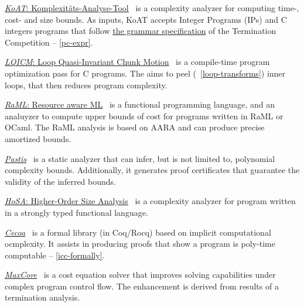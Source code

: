\begin{description}
\item  \href{https://koat.verify.rwth-aachen.de/cfr_mprf}{\emph{KoAT}:
       \underline{Ko}mplexitäts-\underline{A}nalyse-\underline{T}ool}~\cite{brockschmidt2016}
       is a complexity analyzer for computing time-, cost- and size bounds.
       As inputs, KoAT accepts Integer Programs (IPs) and C integers programs that follow
       \href{https://termination-portal.org/wiki/C_Integer_Programs}{the grammar specification} of the Termination Competition -- \autoref{pc-expr}.

\item  \href{https://github.com/statycc/LQICM_On_C_Toy_Parser}{\emph{LQICM}: Loop Quasi-Invariant Chunk Motion}~\cite{moyen20172}
       is a compile-time program optimization pass for C programs.
       The aims to peel (\cf~\autoref{loop-transforms}) inner loops, that then reduces program complexity.

\item   \href{https://www.raml.co/about/}{\emph{RaML}: Resource aware ML}~\cite{hoffmann2017}
       is a functional programming language, and an analuyzer to compute upper bounds of cost for programs
       written in RaML or OCaml.
       The RaML analysis is based on AARA and can produce precise amortized bounds.

\item \href{https://www.cs.yale.edu/homes/qcar/diss/}{\emph{Pastis}}~\cite{carbonneaux2017}
      is a static analyzer that can infer, but is not limited to, polynomial complexity bounds.
      Additionally, it generates proof certificates that guarantee the validity of the inferred bounds.

\item \href{http://cl-informatik.uibk.ac.at/users/zini/software/hosa/}{\emph{HoSA}:
      Higher-Order Size Analysis}~\cite{avanzini2017}
      is a complexity analyzer for program written in a strongly typed functional language.

\item \href{https://github.com/davidnowak/cecoa}{\emph{Cecoa}}~\cite{feree2018}
       is a formal library (in Coq/Rocq) based on implicit computational ocmplexity.
       It assists in producing proofs that show a program is poly-time computable -- \autoref{icc-formally}.

\item \href{https://costa.fdi.ucm.es/maxcore/}{\emph{MaxCore}}~\cite{albert2019}
       is a cost equation solver that improves solving capabilities under complex program control flow.
       The enhancement is derived from results of a termination analysis.


\end{description}
